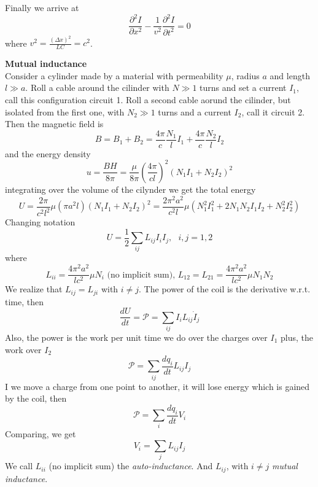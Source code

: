 \documentclass[12pt,a4paper]{article}
\newcommand{\dt}[1]{\frac{d #1}{dt}} %
\begin{document}
Finally we arrive at
\begin{equation}
	\frac{\partial^2 I}{\partial x^2} - \frac{1}{v^2}\frac{\partial^2 I}{\partial t^2} = 0
\end{equation}
where $v^2 = \frac{(\Delta x)^2}{LC} = c^2$.

\textbf{Mutual inductance}\\
Consider a cylinder made by a material with permeability $\mu$, radius $a$ and length $l\gg a$. Roll a cable around the cilinder with $N\gg 1$ turns and set a current $I_1$, call this configuration circuit 1. Roll a second cable aorund the cilinder, but isolated from the first one, with $N_2 \gg 1$ turns and a current $I_2$, call it circuit 2. Then the magnetic field is
\begin{equation}
	B = B_1 + B_2 = \frac{4\pi}{c}\frac{N_1}{l}I_1 + \frac{4\pi}{c}\frac{N_2}{l}I_2
\end{equation}
and the energy density
\begin{equation}
	u = \frac{BH}{8\pi} = \frac{\mu}{8\pi}\left(\frac{4\pi}{cl} \right)^2 (N_1 I_1 + N_2 I_2)^2
\end{equation}
integrating over the volume of the cilynder we get the total energy
\begin{equation}
	U = \frac{2\pi}{c^2 l^2}\mu (\pi a^2 l)(N_1 I_1 + N_2 I_2)^2 = \frac{2\pi^2 a^2}{c^2 l}\mu (N_1^2 I^2_1 + 2N_1N_2 I_1 I_2 + N_2^2 I_2^2)
\end{equation}
Changing notation
\begin{equation}
	U = \frac{1}{2} \sum_{ij}L_{ij}I_iI_j,\ \ \ i,j =1,2
\end{equation}
where
\begin{equation}
	L_{ii} =  \frac{4\pi^2 a^2}{lc^2}\mu N_i \text{  (no implicit sum), } L_{12} = L_{21} =  \frac{4\pi^2 a^2}{lc^2}\mu N_1N_2
\end{equation}
We realize that $L_{ij} = L_{ji}$ with $i\ne j$. The power of the coil is the derivative w.r.t. time, then
\begin{equation}
	\dt{U} = \mathcal{P} = \sum_{ij}I_i L_{ij}\dot{I}_j
\end{equation}
Also, the power is the work per unit time we do over the charges over $I_1$ plus, the work over $I_2$
\begin{equation}
	\mathcal{P} = \sum_{ij}\dt{q_i} L_{ij} I_j
\end{equation}
I we move a charge from one point to another, it will lose energy which is gained by the coil, then
\begin{equation}
	\mathcal{P} = \sum_i \dt{q_i} V_i
\end{equation}
Comparing, we get
\begin{equation}
	V_i = \sum_{j} L_{ij}I_j
\end{equation}
We call $L_{ii}$ (no implicit sum) the \textit{auto-inductance}. And $L_{ij}$, with $i\neq j$ \textit{mutual inductance}.
\end{document}
